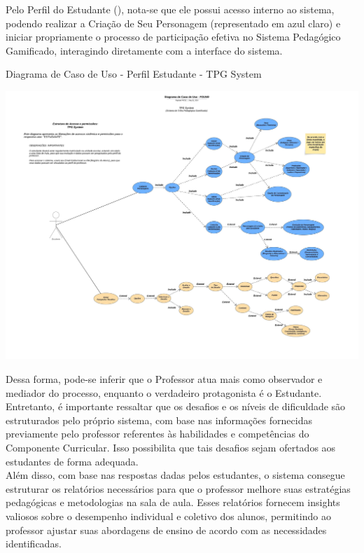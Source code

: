 Pelo Perfil do Estudante (), nota-se que ele possui acesso interno ao sistema, podendo realizar a Criação de Seu Personagem (representado em azul claro) e iniciar propriamente o processo de participação efetiva no Sistema Pedagógico Gamificado, interagindo diretamente com a interface do sistema.
\\

\begin{flowchart}[!h]
\centering
\caption{Diagrama de Caso de Uso - Perfil Estudante - TPG System}%
\label{fcht:imgdgCuE.jpg}
\includegraphics[scale=0.33]{Illustrations/imgdgCuE.jpg}
\end{flowchart}

Dessa forma, pode-se inferir que o Professor atua mais como observador e mediador do processo, enquanto o verdadeiro protagonista é o Estudante. Entretanto, é importante ressaltar que os desafios e os níveis de dificuldade são estruturados pelo próprio sistema, com base nas informações fornecidas previamente pelo professor referentes às habilidades e competências do Componente Curricular. Isso possibilita que tais desafios sejam ofertados aos estudantes de forma adequada.
\\

Além disso, com base nas respostas dadas pelos estudantes, o sistema consegue estruturar os relatórios necessários para que o professor melhore suas estratégias pedagógicas e metodologias na sala de aula. Esses relatórios fornecem insights valiosos sobre o desempenho individual e coletivo dos alunos, permitindo ao professor ajustar suas abordagens de ensino de acordo com as necessidades identificadas.
\\

